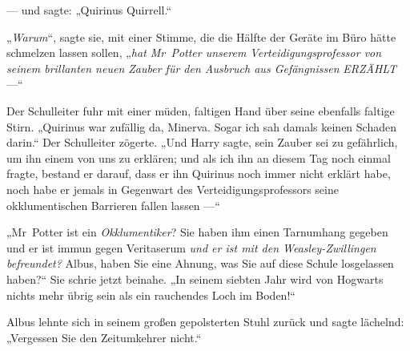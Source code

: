 — und sagte:
„Quirinus Quirrell.“

„\emph{Warum}“, sagte sie, mit einer Stimme, die die Hälfte der Geräte im Büro hätte schmelzen lassen sollen,
„\emph{hat Mr~Potter unserem Verteidigungsprofessor von seinem brillanten neuen Zauber für den Ausbruch aus Gefängnissen} \emph{ERZÄHLT} —“

Der Schulleiter fuhr mit einer müden, faltigen Hand über seine ebenfalls faltige Stirn.
„Quirinus war zufällig da, Minerva. Sogar ich sah damals keinen Schaden darin.“ Der Schulleiter zögerte.
„Und Harry sagte, sein Zauber sei zu gefährlich, um ihn einem von uns zu erklären; und als ich ihn an diesem Tag noch einmal fragte, bestand er darauf, dass er ihn Quirinus noch immer nicht erklärt habe, noch habe er jemals in Gegenwart des Verteidigungsprofessors seine okklumentischen Barrieren fallen lassen —“

„Mr~Potter ist ein \emph{Okklumentiker}? Sie haben ihm einen Tarnumhang gegeben und er ist immun gegen Veritaserum \emph{und er ist mit den Weasley-Zwillingen befreundet?} Albus, haben Sie eine Ahnung, was Sie auf diese Schule losgelassen haben?“ Sie schrie jetzt beinahe.
„In seinem siebten Jahr wird von Hogwarts nichts mehr übrig sein als ein rauchendes Loch im Boden!“

Albus lehnte sich in seinem großen gepolsterten Stuhl zurück und sagte lächelnd:
„Vergessen Sie den Zeitumkehrer nicht.“

